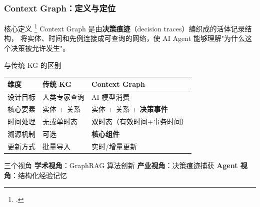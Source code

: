 \documentclass[aspectratio=169,10pt]{beamer}
\let\oldcite\cite
\renewcommand{\cite}[1]{\oldcite{#1}\footcitetext{#1}}
\begin{document}
\begin{frame}
  \frametitle{Context Graph：定义与定位}

  \begin{block}{核心定义 \cite{foundationcapital2024context}}
    Context Graph 是由\textbf{决策痕迹}（decision traces）编织成的活体记录结构，
    将实体、时间和先例连接成可查询的网络，使 AI Agent 能够理解"为什么这个决策被允许发生"。
  \end{block}

  \vspace{0.3cm}

  \begin{block}{与传统 KG 的区别}
    \small
    \begin{tabular}{p{2.2cm}|p{4cm}|p{4.5cm}}
      \textbf{维度} & \textbf{传统 KG} & \textbf{Context Graph} \\
      \hline
      设计目标 & 人类专家查询 & AI 模型消费 \\
      核心要素 & 实体 + 关系 & 实体 + 关系 + \textbf{决策事件} \\
      时间处理 & 无或单时态 & 双时态（有效时间+事务时间） \\
      溯源机制 & 可选 & \textbf{核心组件} \\
      更新方式 & 批量导入 & 实时/增量更新 \\
    \end{tabular}
  \end{block}

  \begin{block}{三个视角}
    \small
    \textbf{学术视角}：GraphRAG 算法创新 \quad
    \textbf{产业视角}：决策痕迹捕获 \quad
    \textbf{Agent 视角}：结构化经验记忆
  \end{block}
\end{frame}
\end{document}

